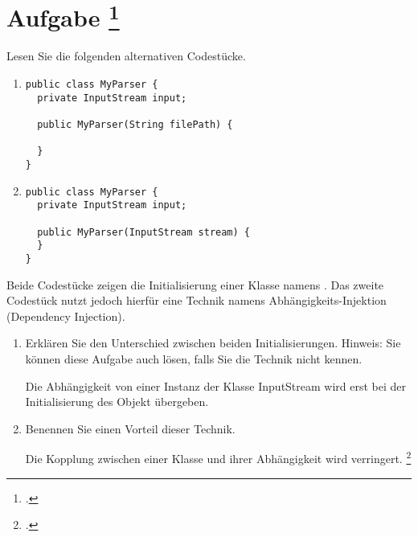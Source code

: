 \documentclass{lehramt-informatik-aufgabe}
\begin{document}
\let\j=\liJavaCode

\section{Aufgabe
\footcite{examen:66116:2021:03}}

Lesen Sie die folgenden alternativen Codestücke.

\begin{enumerate}
\item

\begin{verbatim}
public class MyParser {
  private InputStream input;

  public MyParser(String filePath) {

  }
}
\end{verbatim}

\item

\begin{verbatim}
public class MyParser {
  private InputStream input;

  public MyParser(InputStream stream) {
  }
}
\end{verbatim}

\end{enumerate}
Beide Codestücke zeigen die Initialisierung einer Klasse namens
\j{MyParser}. Das zweite Codestück nutzt jedoch hierfür eine Technik
namens Abhängigkeits-Injektion (Dependency Injection).

\begin{enumerate}


\item Erklären Sie den Unterschied zwischen beiden Initialisierungen.
Hinweis: Sie können diese Aufgabe auch lösen, falls Sie die Technik
nicht kennen.

\begin{liAntwort}
Die Abhängigkeit von einer Instanz der Klasse InputStream wird erst bei
der Initialisierung des Objekt übergeben.
\end{liAntwort}


\item Benennen Sie einen Vorteil dieser Technik.

\begin{liAntwort}
Die Kopplung zwischen einer Klasse und ihrer Abhängigkeit wird verringert.
\footcite{wiki:dependency-injection}
\end{liAntwort}

\end{enumerate}
\end{document}
